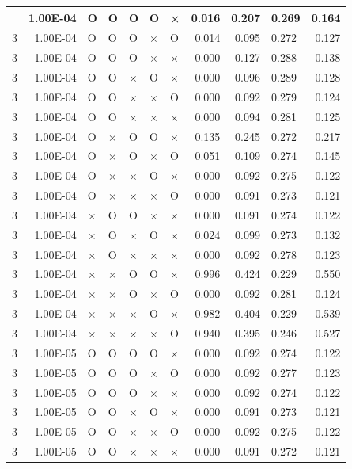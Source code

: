 \documentclass[11pt]{article}
\begin{document}
\begin{longtable}[h]{|r|r|l|l|l|l|l|r|r|l|r|}
\hline
\endlastfoot
3 & 1.00E-04 & O & O & O & O & × & 0.016 & 0.207 & 0.269 & 0.164 \\ \hline
3 & 1.00E-04 & O & O & O & × & O & 0.014 & 0.095 & 0.272 & 0.127 \\ \hline
3 & 1.00E-04 & O & O & O & × & × & 0.000 & 0.127 & 0.288 & 0.138 \\ \hline
3 & 1.00E-04 & O & O & × & O & × & 0.000 & 0.096 & 0.289 & 0.128 \\ \hline
3 & 1.00E-04 & O & O & × & × & O & 0.000 & 0.092 & 0.279 & 0.124 \\ \hline
3 & 1.00E-04 & O & O & × & × & × & 0.000 & 0.094 & 0.281 & 0.125 \\ \hline
3 & 1.00E-04 & O & × & O & O & × & 0.135 & 0.245 & 0.272 & 0.217 \\ \hline
3 & 1.00E-04 & O & × & O & × & O & 0.051 & 0.109 & 0.274 & 0.145 \\ \hline
3 & 1.00E-04 & O & × & × & O & × & 0.000 & 0.092 & 0.275 & 0.122 \\ \hline
3 & 1.00E-04 & O & × & × & × & O & 0.000 & 0.091 & 0.273 & 0.121 \\ \hline
3 & 1.00E-04 & × & O & O & × & × & 0.000 & 0.091 & 0.274 & 0.122 \\ \hline
3 & 1.00E-04 & × & O & × & O & × & 0.024 & 0.099 & 0.273 & 0.132 \\ \hline
3 & 1.00E-04 & × & O & × & × & × & 0.000 & 0.092 & 0.278 & 0.123 \\ \hline
3 & 1.00E-04 & × & × & O & O & × & 0.996 & 0.424 & 0.229 & 0.550 \\ \hline
3 & 1.00E-04 & × & × & O & × & O & 0.000 & 0.092 & 0.281 & 0.124 \\ \hline
3 & 1.00E-04 & × & × & × & O & × & 0.982 & 0.404 & 0.229 & 0.539 \\ \hline
3 & 1.00E-04 & × & × & × & × & O & 0.940 & 0.395 & 0.246 & 0.527 \\ \hline
3 & 1.00E-05 & O & O & O & O & × & 0.000 & 0.092 & 0.274 & 0.122 \\ \hline
3 & 1.00E-05 & O & O & O & × & O & 0.000 & 0.092 & 0.277 & 0.123 \\ \hline
3 & 1.00E-05 & O & O & O & × & × & 0.000 & 0.092 & 0.274 & 0.122 \\ \hline
3 & 1.00E-05 & O & O & × & O & × & 0.000 & 0.091 & 0.273 & 0.121 \\ \hline
3 & 1.00E-05 & O & O & × & × & O & 0.000 & 0.092 & 0.275 & 0.122 \\ \hline
3 & 1.00E-05 & O & O & × & × & × & 0.000 & 0.091 & 0.272 & 0.121 \\ \hline

\end{longtable}
\end{document}
